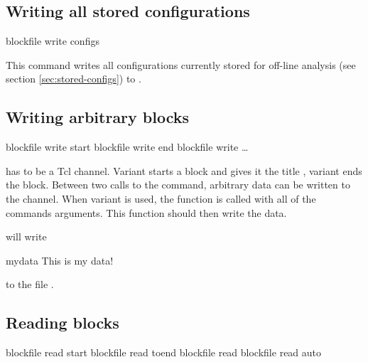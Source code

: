 \subsection{Writing all stored configurations}
\label{sec:blockfile:configs}
\begin{essyntax}
  blockfile  write configs
\end{essyntax}

This command writes all configurations currently stored for off-line
analysis (see section \vref{sec:stored-configs}) to .

\subsection{Writing arbitrary blocks}

\begin{essyntax}
   blockfile  write start 
   blockfile  write end
   blockfile  write  \dots
\end{essyntax}

 has to be a Tcl channel. Variant  starts a
block and gives it the title , variant  ends the
block. Between two calls to the command, arbitrary data can be written
to the channel.  When variant  is used, the function
 is called with all of the commands
arguments. This function should then write the data.


will write 
\begin{tclcode}
{mydata {This is my data!}}
\end{tclcode}
to the file .

\subsection{Reading blocks}

\begin{essyntax}
   blockfile  read start 
   blockfile  read toend 
   blockfile  read 
   blockfile  read auto 
\end{essyntax}

